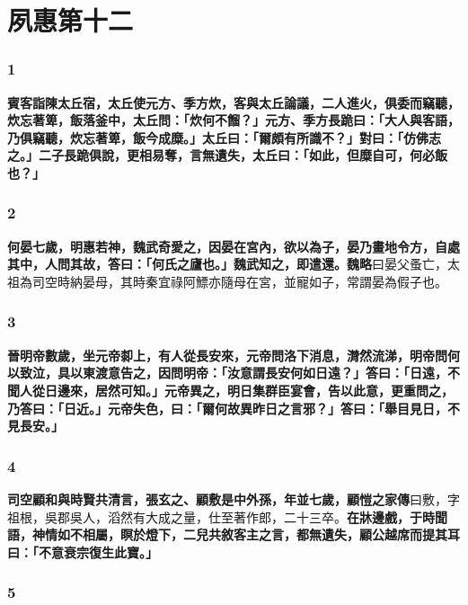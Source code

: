 \chapter{夙惠第十二}

\subsection*{1}

\textbf{賓客詣陳太丘宿，太丘使元方、季方炊，客與太丘論議，二人進火，俱委而竊聽，炊忘著箄，飯落釜中，太丘問：「炊何不餾？」元方、季方長跪曰：「大人與客語，乃俱竊聽，炊忘著箄，飯今成糜。」太丘曰：「爾頗有所識不？」對曰：「仿佛志之。」二子長跪俱說，更相易奪，言無遺失，太丘曰：「如此，但糜自可，何必飯也？」}

\subsection*{2}

\textbf{何晏七歲，明惠若神，魏武奇愛之，因晏在宮內，欲以為子，晏乃畫地令方，自處其中，人問其故，答曰：「何氏之廬也。」魏武知之，即遣還。}{\footnotesize \textbf{魏略}曰晏父蚤亡，太祖為司空時納晏母，其時秦宜祿阿鰾亦隨母在宮，並寵如子，常謂晏為假子也。}

\subsection*{3}

\textbf{晉明帝數歲，坐元帝厀上，有人從長安來，元帝問洛下消息，潸然流涕，明帝問何以致泣，具以東渡意告之，因問明帝：「汝意謂長安何如日遠？」答曰：「日遠，不聞人從日邊來，居然可知。」元帝異之，明日集群臣宴會，告以此意，更重問之，乃答曰：「日近。」元帝失色，曰：「爾何故異昨日之言邪？」答曰：「舉目見日，不見長安。」}

\subsection*{4}

\textbf{司空顧和與時賢共清言，張玄之、顧敷是中外孫，年並七歲，}{\footnotesize \textbf{顧愷之家傳}曰敷，字祖根，吳郡吳人，滔然有大成之量，仕至著作郎，二十三卒。}\textbf{在牀邊戲，于時聞語，神情如不相屬，瞑於燈下，二兒共敘客主之言，都無遺失，顧公越席而提其耳曰：「不意衰宗復生此寶。」}

\subsection*{5}

